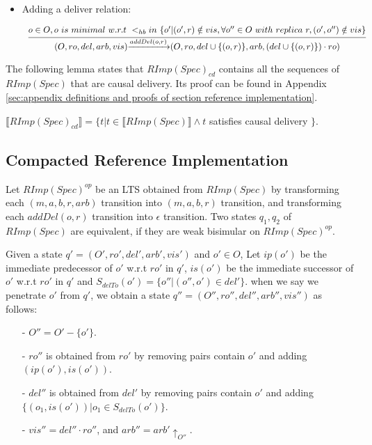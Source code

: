 \begin {itemize}
\setlength{\itemsep}{0.5pt}
\item[-] Adding a deliver relation:

$\begin{array}{l c} \bigfrac{o \in O, o \ is \ minimal \ w.r.t \ <_{hb} in \ \{ o' \vert (o',r) \notin vis, \forall o'' \in O \ with \ replica \ r, (o',o'') \notin vis \}} {(O,ro,del,arb,vis) {\xrightarrow{addDel(o,r)}} (O,ro,del \cup \{ (o,r) \},arb,(del \cup \{ (o,r) \}) \cdot ro)} \end{array}$

\end{itemize}

The following lemma states that $RImp(Spec)_{\textit{cd}}$ contains all the sequences of $RImp(Spec)$ that are causal delivery. Its proof can be found in Appendix \ref{sec:appendix definitions and proofs of section reference implementation}.

\begin{lemma}
\label{lemma:RImpcdSpec contains all the sequences of RImpSpec that are causal delivery}
$\llbracket RImp(Spec)_{\textit{cd}} \rrbracket = \{ t \vert t \in \llbracket RImp(Spec) \rrbracket \wedge t$ satisfies causal delivery $\}$.
\end{lemma}



\subsection{Compacted Reference Implementation}
\label{subsec:compacted reference implementation}

Let $RImp(Spec)^{op}$ be an LTS obtained from $RImp(Spec)$ by transforming each $(m,a,b,r,arb)$ transition into $(m,a,b,r)$ transition, and transforming each $addDel(o,r)$ transition into $\epsilon$ transition. Two states $q_1,q_2$ of $RImp(Spec)$ are equivalent, if they are weak bisimular on $RImp(Spec)^{op}$.

Given a state $q'=(O',ro',del',arb',vis')$ and $o' \in O$, Let $ip(o')$ be the immediate predecessor of $o'$ w.r.t $ro'$ in $q'$, $is(o')$ be the immediate successor of $o'$ w.r.t $ro'$ in $q'$ and $S_{delTo}(o') = \{o'' \vert (o'',o') \in del' \}$. when we say we penetrate $o'$ from $q'$, we obtain a state $q''=(O'',ro'',del'',arb'',vis'')$ as follows:

\begin{itemize}
\setlength{\itemsep}{0.5pt}
\item[-] $O'' = O' - \{ o' \}$.

\item[-] $ro''$ is obtained from $ro'$ by removing pairs contain $o'$ and adding $(ip(o'),is(o'))$.

\item[-] $del''$ is obtained from $del'$ by removing pairs contain $o'$ and adding $\{ (o_1,is(o')) \vert o_1 \in S_{delTo}(o')\}$.

\item[-] $vis'' = del'' \cdot ro''$, and $arb'' = arb' \uparrow_{O''}$.
\end{itemize}

